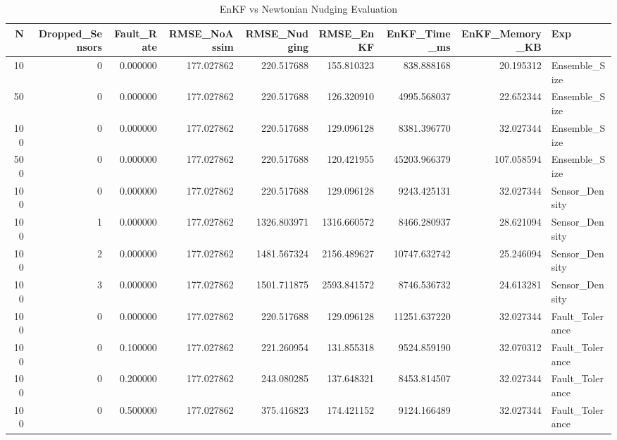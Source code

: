 \begin{table}
\caption{EnKF vs Newtonian Nudging Evaluation}
\begin{tabular}{rrrrrrrrl}
\toprule
N & Dropped_Sensors & Fault_Rate & RMSE_NoAssim & RMSE_Nudging & RMSE_EnKF & EnKF_Time_ms & EnKF_Memory_KB & Exp \\
\midrule
10 & 0 & 0.000000 & 177.027862 & 220.517688 & 155.810323 & 838.888168 & 20.195312 & Ensemble_Size \\
50 & 0 & 0.000000 & 177.027862 & 220.517688 & 126.320910 & 4995.568037 & 22.652344 & Ensemble_Size \\
100 & 0 & 0.000000 & 177.027862 & 220.517688 & 129.096128 & 8381.396770 & 32.027344 & Ensemble_Size \\
500 & 0 & 0.000000 & 177.027862 & 220.517688 & 120.421955 & 45203.966379 & 107.058594 & Ensemble_Size \\
100 & 0 & 0.000000 & 177.027862 & 220.517688 & 129.096128 & 9243.425131 & 32.027344 & Sensor_Density \\
100 & 1 & 0.000000 & 177.027862 & 1326.803971 & 1316.660572 & 8466.280937 & 28.621094 & Sensor_Density \\
100 & 2 & 0.000000 & 177.027862 & 1481.567324 & 2156.489627 & 10747.632742 & 25.246094 & Sensor_Density \\
100 & 3 & 0.000000 & 177.027862 & 1501.711875 & 2593.841572 & 8746.536732 & 24.613281 & Sensor_Density \\
100 & 0 & 0.000000 & 177.027862 & 220.517688 & 129.096128 & 11251.637220 & 32.027344 & Fault_Tolerance \\
100 & 0 & 0.100000 & 177.027862 & 221.260954 & 131.855318 & 9524.859190 & 32.070312 & Fault_Tolerance \\
100 & 0 & 0.200000 & 177.027862 & 243.080285 & 137.648321 & 8453.814507 & 32.027344 & Fault_Tolerance \\
100 & 0 & 0.500000 & 177.027862 & 375.416823 & 174.421152 & 9124.166489 & 32.027344 & Fault_Tolerance \\
\bottomrule
\end{tabular}
\end{table}
